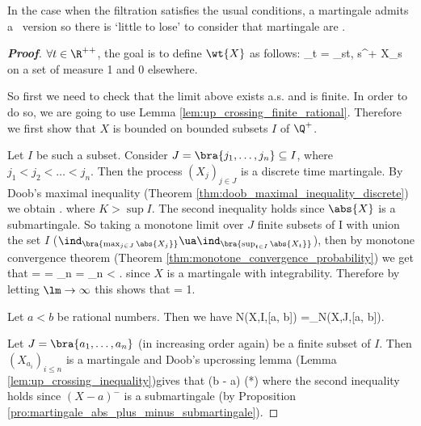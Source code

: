 \begin{remark}
In the case when the filtration satisfies the usual conditions, a martingale admits a \cadlag\ version so there is `little to lose' to consider that martingale are \cadlag.
\end{remark}

\begin{proof}[\bf Proof]
$\forall t\in \R^{++}$, the goal is to define $\wt{X}$ as follows:
\be
{}_t = \lim_{s\da t, s\in \Q^+} X_s
\ee
on a set of measure 1 and 0 elsewhere.

So first we need to check that the limit above exists a.s. and is finite. In order to do so, we are going to use Lemma \ref{lem:up_crossing_finite_rational}. Therefore we first show that $X$ is bounded on bounded subsets $I$ of $\Q^+$.

Let $I$ be such a subset. Consider $J = \bra{j_1,\dots, j_n} \subseteq I$, where $j_1 < j_2 < \dots < j_n$. Then the process $(X_j)_{j\in J}$ is a discrete time martingale. By Doob's maximal inequality (Theorem \ref{thm:doob_maximal_inequality_discrete}) we obtain %
\be
\lm \pro{} \leq \E{} \leq \E{}.
\ee
where $K > \sup I$. The second inequality holds since $\abs{X}$ is a submartingale. So taking a monotone limit over $J$ finite subsets of I with union the set $I$ ($\ind_{\bra{\max_{j\in J}\abs{X_j}}} \ua \ind_{\bra{\sup_{t\in I}\abs{X_t}}}$), then by monotone convergence theorem (Theorem \ref{thm:monotone_convergence_probability}) we get that
\be
\lm \pro{} = \lm \E{} = \lm \lim_{n\to \infty}  \E {}= \lm \lim_{n\to \infty} \pro{} \leq \E{} < \infty.
\ee
since $X$ is a martingale with integrability. Therefore by letting $\lm  \to \infty$ this shows that
\be
\pro{} = 1.
\ee

Let $a < b$ be rational numbers. Then we have
\be
N(X,I,[a, b]) =\sup_{}N(X,J,[a, b]).
\ee

Let $J = \bra{a_1,\dots, a_n}$ (in increasing order again) be a finite subset of $I$. Then $(X_{a_i})_{i\leq n}$ is a martingale and Doob's upcrossing lemma (Lemma \ref{lem:up_crossing_inequality})gives that
\be
(b - a)\E{} \leq \E{} \leq \E{}\quad \quad (*)
\ee
where the second inequality holds since $(X-a)^-$ is a submartingale (by Proposition \ref{pro:martingale_abs_plus_minus_submartingale}).


\end{proof}
